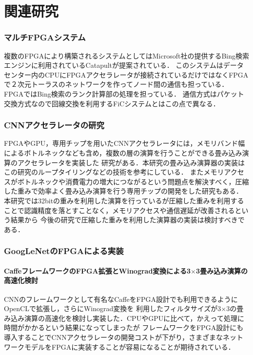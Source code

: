\chapter{関連研究}
{
\label{chap:survey}

\subsection{マルチFPGAシステム}
複数のFPGAにより構築されるシステムとしてはMicrosoft社の提供するBing検索エンジンに利用されているCatapult\cite{catapult1st}が提案されている．
このシステムはデータセンター内のCPUにFPGAアクセラレータが接続されているだけではなくFPGAで２次元トーラスのネットワークを作ってノード間の通信も担っている．
FPGAではBing検索のランク計算部の処理を担っている．
通信方式はパケット交換方式なので回線交換を利用するFiCシステムとはこの点で異なる．

\subsection{CNNアクセラレータの研究}
FPGAやGPU，専用チップを用いたCNNアクセラレータには，メモリバンド幅によるボトルネックなども含め，複数の層の演算を行うことができる畳み込み演算のアクセラレータを実装した
研究\cite{optimized}がある．本研究の畳み込み演算器の実装はこの研究のループタイリングなどの技術を参考にしている．
またメモリアクセスがボトルネックや消費電力の増大につながるという問題点を解決すべく，圧縮した重みで効率よく畳み込み演算を行う専用チップの開発をした研究もある\cite{EIE}．
本研究では32bitの重みを利用した演算を行っているが圧縮した重みを利用することで認識精度を落とすことなく，メモリアクセスや通信遅延が改善されるという結果から
今後の研究で圧縮した重みを利用した演算器の実装は検討すべきである．

\subsection{GoogLeNetのFPGAによる実装}

\subsubsection{CaffeフレームワークのFPGA拡張とWinograd変換による3$\times$3畳み込み演算の高速化検討\cite{caffeinated}}
CNNのフレームワークとして有名なCaffeをFPGA設計でも利用できるようにOpenCLで拡張し，さらにWinograd変換を
利用したフィルタサイズが3$\times$3の畳み込み演算の高速化を検討し実装した．CPUやGPUに比べて，かえって処理に時間がかかるという結果になってしまったが
フレームワークをFPGA設計にも導入することでCNNアクセラレータの開発コストが下がり，さまざまなネットワークモデルをFPGAに実装することが容易になることが期待されている．

}
